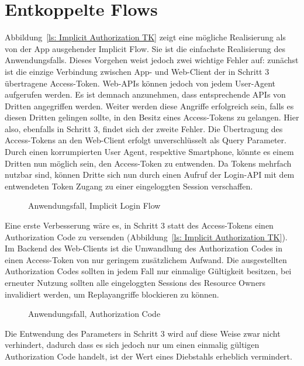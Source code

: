 \section{Entkoppelte Flows}\label{ch:entkoppelteFlows}
Abbildung~\ref{ls: Implicit Authorization TK} zeigt eine mögliche Realisierung
als von der App ausgehender Implicit Flow. Sie ist die einfachste Realisierung
des Anwendungsfalls. Dieses Vorgehen weist jedoch zwei wichtige Fehler auf:
zunächst ist die einzige Verbindung zwischen App- und Web-Client der in
Schritt 3 übertragene Access-Token. Web-APIs können jedoch von jedem User-Agent
aufgerufen werden. Es ist demnach anzunehmen, dass entsprechende APIs von
Dritten angegriffen werden. Weiter werden diese Angriffe erfolgreich sein, falls
es diesen Dritten gelingen sollte, in den Besitz eines Access-Tokens zu
gelangen. Hier also, ebenfalls in Schritt 3, findet sich der zweite Fehler. Die
Übertragung des Access-Tokens an den Web-Client erfolgt unverschlüsselt als
Query Parameter. Durch einen korrumpierten User Agent, respektive Smartphone,
könnte es einem Dritten nun möglich sein, den Access-Token zu entwenden. Da
Tokens mehrfach nutzbar sind, können Dritte sich nun durch einen Aufruf der
Login-API mit dem entwendeten Token Zugang zu einer eingeloggten
Session verschaffen.
\begin{figure}[h]
    \scalebox{.5}{
        
    }
    \caption{Anwendungsfall, Implicit Login Flow}\label{ls: Implicit Authorization
    TK}
\end{figure} \noindent
Eine erste Verbesserung wäre es, in Schritt 3 statt des Access-Tokens einen
Authorization Code zu versenden (Abbildung~\ref{ls: Implicit Authorization TK}).
Im Backend des Web-Clients ist die Umwandlung des Authorization Codes in einen
Access-Token von nur geringem zusätzlichem Aufwand. Die ausgestellten
Authorization Codes sollten in jedem Fall nur einmalige Gültigkeit besitzen, bei
erneuter Nutzung sollten alle eingeloggten Sessions des Resource Owners
invalidiert werden, um Replayangriffe blockieren zu können.
\begin{figure}[h]
    \scalebox{.5}{
        
    }
    \caption{Anwendungsfall, Authorization Code}\label{ls: Authorization Code TK}
\end{figure} \noindent
Die Entwendung des Parameters in Schritt 3 wird auf diese Weise zwar nicht
verhindert, dadurch dass es sich jedoch nur um einen einmalig gültigen
Authorization Code handelt, ist der Wert eines Diebstahls erheblich vermindert.
